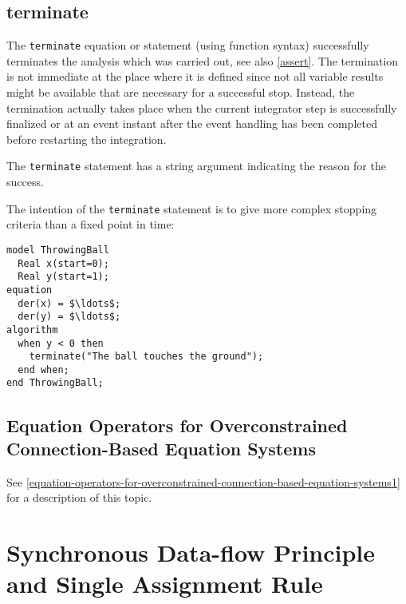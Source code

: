 \subsection{terminate}\label{terminate}

The \lstinline!terminate! equation or statement (using function syntax) successfully terminates the analysis which was carried out, see also \cref{assert}.
The termination is not immediate at the place where it is defined since not all variable results might be available that are necessary for a successful stop.
Instead, the termination actually takes place when the current integrator step is successfully finalized or at an event instant after the event handling has been completed before restarting the integration.

The \lstinline!terminate! statement has a string argument indicating the reason for the success.

\begin{example}
The intention of the \lstinline!terminate! statement is to give more complex stopping criteria than a fixed point in time:
\begin{lstlisting}[language=modelica]
model ThrowingBall
  Real x(start=0);
  Real y(start=1);
equation
  der(x) = $\ldots$;
  der(y) = $\ldots$;
algorithm
  when y < 0 then
    terminate("The ball touches the ground");
  end when;
end ThrowingBall;
\end{lstlisting}
\end{example}

\subsection{Equation Operators for Overconstrained Connection-Based Equation Systems}\label{equation-operators-for-overconstrained-connection-based-equation-systems}

See \cref{equation-operators-for-overconstrained-connection-based-equation-systems1} for a description of this topic.

\section{Synchronous Data-flow Principle and Single Assignment Rule}\label{synchronous-data-flow-principle-and-single-assignment-rule}

